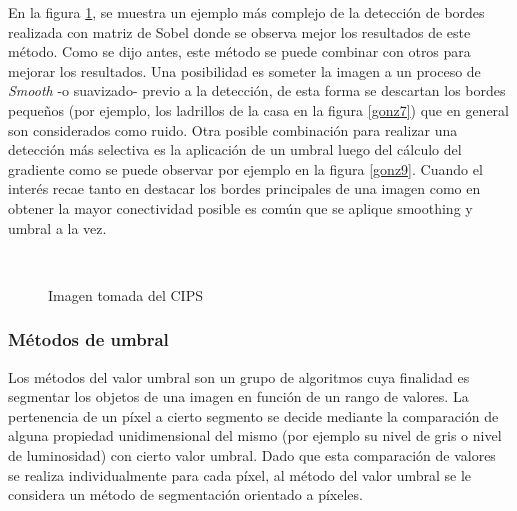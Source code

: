 En la figura \ref{gonz10}, se muestra un ejemplo más complejo de la detección de bordes realizada con matriz de Sobel donde se observa mejor los resultados de este método. Como se dijo antes, este método se puede combinar con otros para mejorar los resultados. Una posibilidad es someter la imagen a un proceso de \textit{Smooth}\cite{smooth} -o suavizado- previo a la detección, de esta forma se descartan los bordes pequeños (por ejemplo, los ladrillos de la casa en la figura \ref{gonz7}) que en general son considerados como ruido. Otra posible combinación para realizar una detección más selectiva es la aplicación de un umbral luego del cálculo del gradiente como se puede observar por ejemplo en la figura \ref{gonz9}. Cuando el interés recae tanto en destacar los bordes principales de una imagen como en obtener la mayor conectividad posible es común que se aplique smoothing y umbral a la vez.

\begin{figure}[H]
 \centering
  \\
 \caption{Imagen tomada del CIPS \cite{procImg}}
 \label{gonz10}
\end{figure}


\subsubsection{Métodos de umbral} %
\label{umbralSec}

Los métodos del valor umbral son un grupo de algoritmos cuya finalidad es segmentar los objetos de una imagen en función de un rango de valores. La pertenencia de un píxel a cierto segmento se decide mediante la comparación de alguna propiedad unidimensional del mismo (por ejemplo su nivel de gris o nivel de luminosidad) con cierto valor umbral. Dado que esta comparación de valores se realiza individualmente para cada píxel, al método del valor umbral se le considera un método de segmentación orientado a píxeles.

